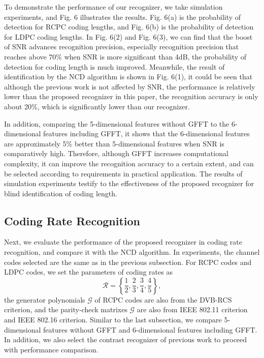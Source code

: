 \documentclass[conference]{IEEEtran}
\begin{document}
To demonstrate the performance of our recognizer, we take simulation experiments, and Fig. 6 illustrates the results. Fig. 6(a) is the probability of detection for RCPC coding lengths, and Fig. 6(b) is the probability of detection for LDPC coding lengths. In Fig. 6(2) and Fig. 6(3), we can find that the boost of SNR advances recognition precision, especially recognition precision that reaches above 70\% when SNR is more significant than 4dB, the probability of detection for coding length is much improved. Meanwhile, the result of identification by the NCD algorithm is shown in Fig. 6(1), it could be seen that although the previous work is not affected by SNR, the performance is relatively lower than the proposed recognizer in this paper, the recognition accuracy is only about 20\%, which is significantly lower than our recognizer. 

In addition, comparing the 5-dimensional features without GFFT to the 6-dimensional features including GFFT, it shows that the 6-dimensional features are approximately 5\% better than 5-dimensional features when SNR is comparatively high. Therefore, although GFFT increases computational complexity, it can improve the recognition accuracy to a certain extent, and can be selected according to requirements in practical application. The results of simulation experiments testify to the effectiveness of the proposed recognizer for blind identification of coding length.


\subsection{Coding Rate Recognition}
Next, we evaluate the performance of the proposed recognizer in coding rate recognition, and compare it with the NCD algorithm. In experiments, the channel codes selected are the same as in the previous subsection. For RCPC codes and LDPC codes, we set the parameters of coding rates as
\begin{equation}
	\mathcal{R} = \left\{\frac{1}{2}, \frac{2}{3}, \frac{3}{4}, \frac{4}{5}\right\},
\end{equation}
the generator polynomials $\mathcal{G}$ of RCPC codes are also from the DVB-RCS criterion, and the parity-check matrixes $\mathcal{G}$ are also from IEEE 802.11 criterion and  IEEE 802.16 criterion. Similar to the last subsection, we compare 5-dimensional features without GFFT and 6-dimensional features including GFFT. In addition, we also select the contrast recognizer of previous work \cite{bonvard2018classification} to proceed with performance comparison.
\end{document}
